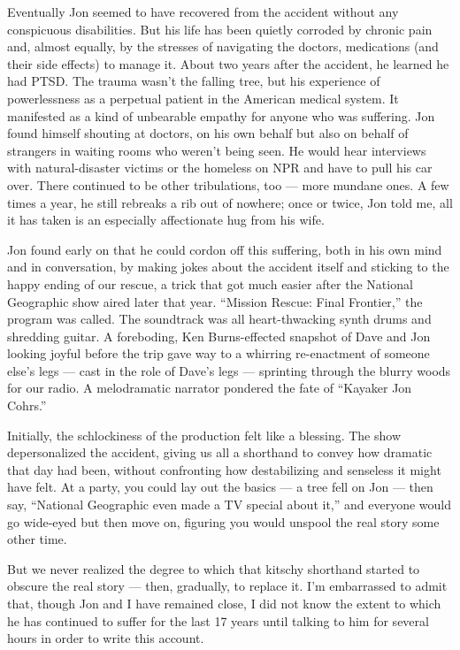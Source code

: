 Eventually Jon seemed to have recovered from the accident without any
conspicuous disabilities. But his life has been quietly corroded by
chronic pain and, almost equally, by the stresses of navigating the
doctors, medications (and their side effects) to manage it. About two
years after the accident, he learned he had PTSD. The trauma wasn't the
falling tree, but his experience of powerlessness as a perpetual patient
in the American medical system. It manifested as a kind of unbearable
empathy for anyone who was suffering. Jon found himself shouting at
doctors, on his own behalf but also on behalf of strangers in waiting
rooms who weren't being seen. He would hear interviews with
natural-disaster victims or the homeless on NPR and have to pull his car
over. There continued to be other tribulations, too --- more mundane
ones. A few times a year, he still rebreaks a rib out of nowhere; once
or twice, Jon told me, all it has taken is an especially affectionate
hug from his wife.

Jon found early on that he could cordon off this suffering, both in his
own mind and in conversation, by making jokes about the accident itself
and sticking to the happy ending of our rescue, a trick that got much
easier after the National Geographic show aired later that year.
``Mission Rescue: Final Frontier,'' the program was called. The
soundtrack was all heart-thwacking synth drums and shredding guitar. A
foreboding, Ken Burns-effected snapshot of Dave and Jon looking joyful
before the trip gave way to a whirring re-enactment of someone else's
legs --- cast in the role of Dave's legs --- sprinting through the
blurry woods for our radio. A melodramatic narrator pondered the fate of
``Kayaker Jon Cohrs.''

Initially, the schlockiness of the production felt like a blessing. The
show depersonalized the accident, giving us all a shorthand to convey
how dramatic that day had been, without confronting how destabilizing
and senseless it might have felt. At a party, you could lay out the
basics --- a tree fell on Jon --- then say, ``National Geographic even
made a TV special about it,'' and everyone would go wide-eyed but then
move on, figuring you would unspool the real story some other time.

But we never realized the degree to which that kitschy shorthand started
to obscure the real story --- then, gradually, to replace it. I'm
embarrassed to admit that, though Jon and I have remained close, I did
not know the extent to which he has continued to suffer for the last 17
years until talking to him for several hours in order to write this
account.


